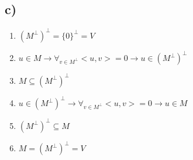 \subsection*{c)}

\begin{enumerate}
	\item $(M^\perp)^\perp = \{0\}^\perp = V$
	\item $u \in M \to \forall_{v \in M^\perp} <u,v> = 0 \to u \in (M^\perp)^\perp$
	\item $M \subseteq (M^\perp)^\perp$
	\item $u \in (M^\perp)^\perp \to \forall_{v \in M^\perp} <u, v> = 0 \to u \in M$
	\item $(M^\perp)^\perp \subseteq M$
	\item $M = (M^\perp)^\perp = V$
\end{enumerate}
